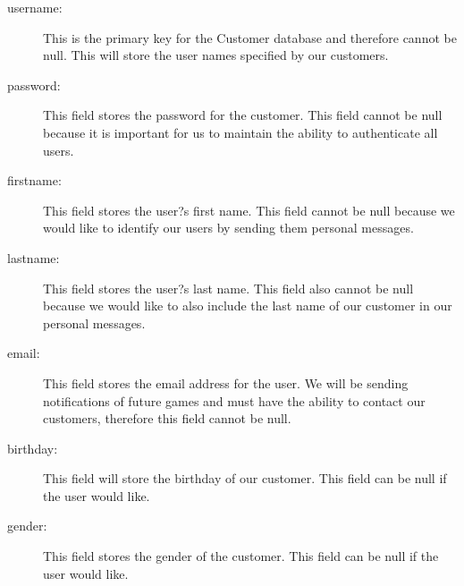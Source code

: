 \begin{description}
				\item[username:] This is the primary key for the Customer database and therefore cannot be null. This will store the user names specified by our customers.
				\item[password:] This field stores the password for the customer. This field cannot be null because it is important for us to maintain the ability to authenticate all users.
				\item[firstname:] This field stores the user?s first name. This field cannot be null because we would like to identify our users by sending them personal messages.
				\item[lastname:] This field stores the user?s last name. This field also cannot be null because we would like to also include the last name of our customer in our personal messages.
				\item[email:] This field stores the email address for the user. We will be sending notifications of future games and must have the ability to contact our customers, therefore this field cannot be null.
				\item[birthday:] This field will store the birthday of our customer. This field can be null if the user would like.
				\item[gender:] This field stores the gender of the customer. This field can be null if the user would like.
			\end{description}

